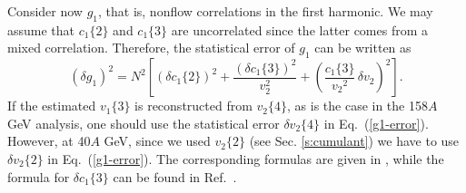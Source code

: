 \documentclass[aps,prc,superscriptaddress,showpacs,floatfix,nofootinbib]{revtex4}
\begin{document}
Consider now $g_1$, that is, nonflow correlations in the first
harmonic.  We may assume that $c_1\{2\}$ and $c_1\{3\}$ are
uncorrelated since the latter comes from a mixed correlation.
Therefore, the statistical error of $g_1$ can be written as
\begin{equation}
\label{g1-error}
\left( \delta g_1 \right)^2 = 
N^2 \left[ (\delta c_1\{2\})^2 + \frac{(\delta c_1\{3\})^2}{v_2^2} + 
\left(\frac{c_1\{3\}}{{v_2}^2}\,\delta v_2 \right)^2 \right].
\end{equation}
If the estimated $v_1\{3\}$ is reconstructed from $v_2\{4\}$, as is
the case in the 158$A$ GeV analysis, one should use the
statistical error $\delta v_2\{4\}$ in Eq.\ (\ref{g1-error}).
However, at 40$A$ GeV, since we used $v_2\{2\}$ (see
Sec. \ref{s:cumulant}) we have to use $\delta v_2\{2\}$ in Eq.\
(\ref{g1-error}).  The corresponding formulas are given in
\cite{Borghini:2001vi}, while the formula for $\delta c_1\{3\}$ can be
found in Ref.~\cite{Borghini:2002vp}.
\end{document}
